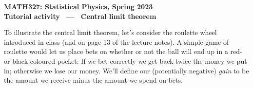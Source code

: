 \documentclass[12 pt]{article} %
\begin{document}
\newcommand{\thisunit}{MATH327 Tutorial (CLT)}
\newcommand{\moddate}{Last modified 30 Jan.~2023}
\begin{center}
  {\Large \textbf{MATH327: Statistical Physics, Spring 2023}} \\[12 pt]
  {\Large \textbf{Tutorial activity \ --- \ Central limit theorem}} \\[24 pt]
\end{center}

To illustrate the central limit theorem, let's consider the roulette wheel introduced in class (and on page 13 of the lecture notes).
A simple game of roulette would let us place bets on whether or not the ball will end up in a red- or black-coloured pocket: If we bet correctly we get back twice the money we put in; otherwise we lose our money.
We'll define our (potentially negative) \textit{gain} to be the amount we receive minus the amount we spend on bets.
\end{document}
